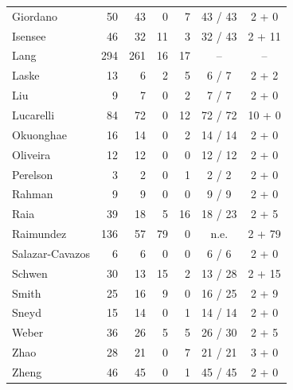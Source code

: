 \begin{longtable}{@{}lrrrrcc@{}}
Giordano & 50 & 43 & 0 & 7 & 43 / 43 & 2 + 0 \\
Isensee & 46 & 32 & 11 & 3 & 32 / 43 & 2 + 11 \\
Lang & 294 & 261 & 16 & 17 & -- & -- \\
Laske & 13 & 6 & 2 & 5 & 6 / 7 & 2 + 2 \\
Liu & 9 & 7 & 0 & 2 & 7 / 7 & 2 + 0 \\
Lucarelli & 84 & 72 & 0 & 12 & 72 / 72 & 10 + 0 \\
Okuonghae & 16 & 14 & 0 & 2 & 14 / 14 & 2 + 0 \\
Oliveira & 12 & 12 & 0 & 0 & 12 / 12 & 2 + 0 \\
Perelson & 3 & 2 & 0 & 1 & 2 / 2 & 2 + 0 \\
Rahman & 9 & 9 & 0 & 0 & 9 / 9 & 2 + 0 \\
Raia & 39 & 18 & 5 & 16 & 18 / 23 & 2 + 5 \\
Raimundez & 136 & 57 & 79 & 0 & n.e. & 2 + 79 \\
Salazar-Cavazos & 6 & 6 & 0 & 0 & 6 / 6 & 2 + 0 \\
Schwen & 30 & 13 & 15 & 2 & 13 / 28 & 2 + 15 \\
Smith & 25 & 16 & 9 & 0 & 16 / 25 & 2 + 9 \\
Sneyd & 15 & 14 & 0 & 1 & 14 / 14 & 2 + 0 \\
Weber & 36 & 26 & 5 & 5 & 26 / 30 & 2 + 5 \\
Zhao & 28 & 21 & 0 & 7 & 21 / 21 & 3 + 0 \\
Zheng & 46 & 45 & 0 & 1 & 45 / 45 & 2 + 0 \\
\bottomrule
\end{longtable}
